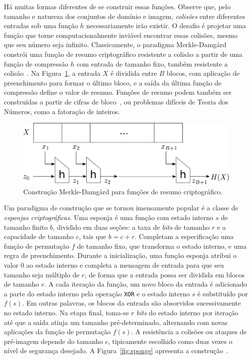 \documentclass{SBCbookchapter}
\begin{document}
Há muitas formas diferentes de se construir essas funções.
Observe que, pelo tamanho e natureza dos conjuntos de domínio e imagem, \emph{colisões} entre diferentes entradas sob uma função $h$ necessariamente irão existir. O desafio é projetar uma função que torne computacionalmente inviável encontrar essas colisões, mesmo que seu número seja infinito.
Classicamente, o paradigma Merkle-Damg\aa rd constrói uma função de resumo criptográfico resistente a colisão a partir de uma função de compressão $h$ com entrada de tamanho fixo, também resistente a colisão~\cite{Merkle79,Damgard89a}. Na Figura~\ref{fig:merkle}, a entrada $X$ é dividida entre $B$ blocos, com aplicação de preenchimento para formar o último bloco, e a saída da última função de compressão define o valor de resumo. Funções de resumo podem também ser construídas a partir de cifras de bloco~\cite{PreneelGV93}, ou problemas difíceis de Teoria dos Números, como a fatoração de inteiros.

\begin{figure}[htbp]
\begin{center}
    \includegraphics[scale=0.2]{figures/merkle.pdf}
    \caption{Construção Merkle-Damg\aa rd para funções de resumo criptográfico.}
    \label{fig:merkle}
\end{center}
\end{figure}

Um paradigma de construção que se tornou imensamente popular é a classe de \emph{esponjas criptográficas}. Uma esponja é uma função com estado interno $s$ de tamanho finito $b$, dividido em duas seções: a taxa de \emph{bits} de tamanho $r$ e a capacidade de tamanho $c$, tais que $b = c + r$. Completam a especificação uma função de permutação $f$ de tamanho fixo, que transforma o estado interno, e uma regra de preenchimento. Durante a inicialização, uma função esponja atribui o valor 0 ao estado interno e completa a mensagem de entrada para que seu tamanho seja múltiplo de $r$, de forma que a entrada possa ser dividida em blocos de tamanho $r$. A cada iteração da função, um novo bloco da entrada é adicionado a parte do estado interno pela operação \texttt{XOR} e o estado interno $s$ é substituído por $f(s)$. Em outras palavras, os blocos da entrada são absorvidos sucessivamente no estado interno. Na etapa final, toma-se $r$ \emph{bits} do estado interno por iteração até que a saída atinja um tamanho pré-determinado, alternando com novas aplicações da função de permutação $f(s)$. A resistência a colisões ou ataques de pré-imagem depende do tamanho $c$, tipicamente escolhido como duas vezes o nível de segurança desejado. A Figura~\ref{fig:sponge} apresenta a construção~\cite{BertoniDPA08}.
\end{document}
